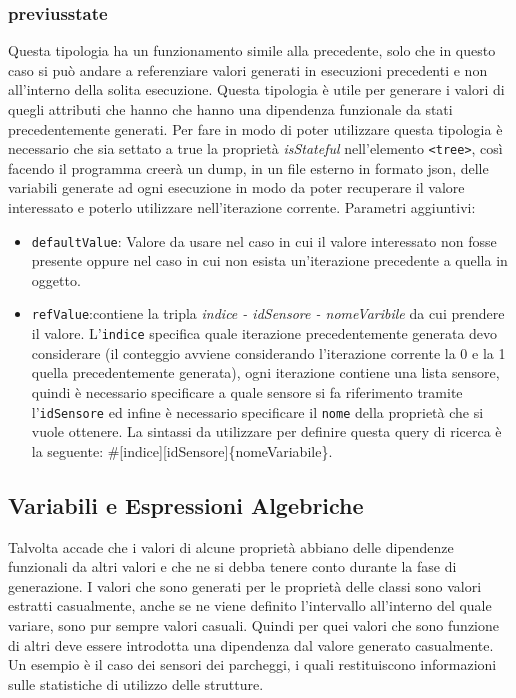 \documentclass[12pt,a4paper,italian]{article}
\begin{document}
\subsubsection{previusstate} Questa tipologia ha un funzionamento simile alla precedente, solo che in questo caso si può andare a referenziare valori generati in esecuzioni precedenti e non all'interno della solita esecuzione.
Questa tipologia è utile per generare i valori di quegli attributi che hanno che hanno una dipendenza funzionale da stati precedentemente generati. Per fare in modo di poter utilizzare questa tipologia è necessario che sia settato a true la proprietà 
\emph{isStateful} nell'elemento \texttt{<tree>}, così facendo il programma creerà un dump, in un file esterno in formato json, delle variabili generate ad ogni esecuzione in modo da poter recuperare il valore interessato e poterlo
utilizzare nell'iterazione corrente.
Parametri aggiuntivi:\\
\begin{itemize}
	\item \texttt{defaultValue}: Valore da usare nel caso in cui il valore interessato non fosse presente oppure nel caso in cui non esista un'iterazione precedente a quella in oggetto.
	\item \texttt{refValue}:contiene la tripla \emph{indice - idSensore - nomeVaribile} da cui prendere il valore. L'\texttt{indice} specifica quale iterazione precedentemente generata devo considerare (il conteggio avviene considerando l'iterazione corrente la 0 e la 1 quella precedentemente generata),
ogni iterazione contiene una lista sensore, quindi è necessario specificare a quale sensore si fa riferimento tramite l'\texttt{idSensore} ed infine è necessario specificare il \texttt{nome} della proprietà che si vuole ottenere.
La sintassi da utilizzare per definire questa query di ricerca è la seguente: \#[indice][idSensore]\{nomeVariabile\}.\\
	\end{itemize}
	
\subsection{Variabili e Espressioni Algebriche}
Talvolta accade che i valori di alcune proprietà abbiano delle dipendenze funzionali da altri valori e che ne si debba tenere conto durante la fase di generazione.
I valori che sono generati per le proprietà delle classi sono valori estratti casualmente, anche se ne viene definito l'intervallo all'interno del quale variare, sono pur sempre valori casuali. 
Quindi per quei valori che sono funzione di altri deve essere introdotta una dipendenza dal valore generato casualmente.\\
Un esempio è il caso dei sensori dei parcheggi, i quali restituiscono informazioni sulle statistiche di utilizzo delle strutture. 
\end{document}
